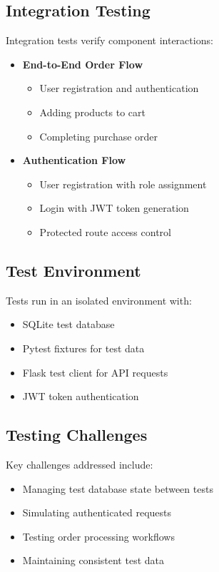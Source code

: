 \documentclass[12pt,a4paper]{article}
\begin{document}
\subsection{Integration Testing}
Integration tests verify component interactions:

\begin{itemize}
    \item \textbf{End-to-End Order Flow}
    \begin{itemize}
        \item User registration and authentication
        \item Adding products to cart
        \item Completing purchase order
    \end{itemize}

    \item \textbf{Authentication Flow}
    \begin{itemize}
        \item User registration with role assignment
        \item Login with JWT token generation
        \item Protected route access control
    \end{itemize}
\end{itemize}

\subsection{Test Environment}
Tests run in an isolated environment with:
\begin{itemize}
    \item SQLite test database
    \item Pytest fixtures for test data
    \item Flask test client for API requests
    \item JWT token authentication
\end{itemize}

\subsection{Testing Challenges}
Key challenges addressed include:
\begin{itemize}
    \item Managing test database state between tests
    \item Simulating authenticated requests
    \item Testing order processing workflows
    \item Maintaining consistent test data
\end{itemize}
\end{document}
